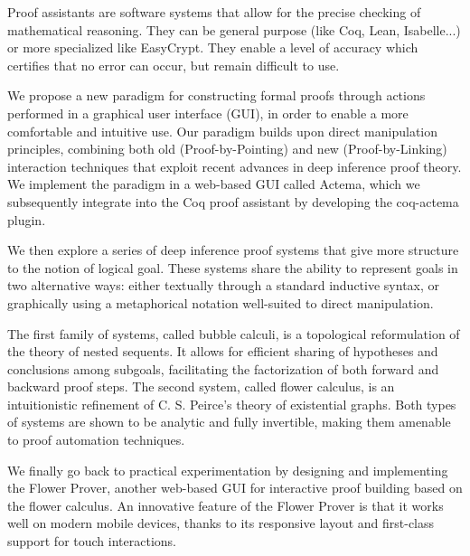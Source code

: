 Proof assistants are software systems that allow for the precise checking of
mathematical reasoning. They can be general purpose (like Coq, Lean,
Isabelle...) or more specialized like EasyCrypt. They enable a level of accuracy
which certifies that no error can occur, but remain difficult to use.

We propose a new paradigm for constructing formal proofs through actions
performed in a graphical user interface (GUI), in order to enable a more
comfortable and intuitive use. Our paradigm builds upon direct manipulation
principles, combining both old (Proof-by-Pointing) and new (Proof-by-Linking)
interaction techniques that exploit recent advances in deep inference proof
theory. We implement the paradigm in a web-based GUI called Actema, which we
subsequently integrate into the Coq proof assistant by developing the coq-actema
plugin.

We then explore a series of deep inference proof systems that give more
structure to the notion of logical goal. These systems share the ability to
represent goals in two alternative ways: either textually through a standard
inductive syntax, or graphically using a metaphorical notation well-suited
to direct manipulation.

The first family of systems, called bubble calculi, is a topological
reformulation of the theory of nested sequents. It allows for efficient
sharing of hypotheses and conclusions among subgoals, facilitating the
factorization of both forward and backward proof steps. The second system,
called flower calculus, is an intuitionistic refinement of C. S. Peirce's
theory of existential graphs. Both types of systems are shown to be analytic
and fully invertible, making them amenable to proof automation techniques.

We finally go back to practical experimentation by designing and implementing
the Flower Prover, another web-based GUI for interactive proof building based on
the flower calculus. An innovative feature of the Flower Prover is that it works
well on modern mobile devices, thanks to its responsive layout and first-class
support for touch interactions.